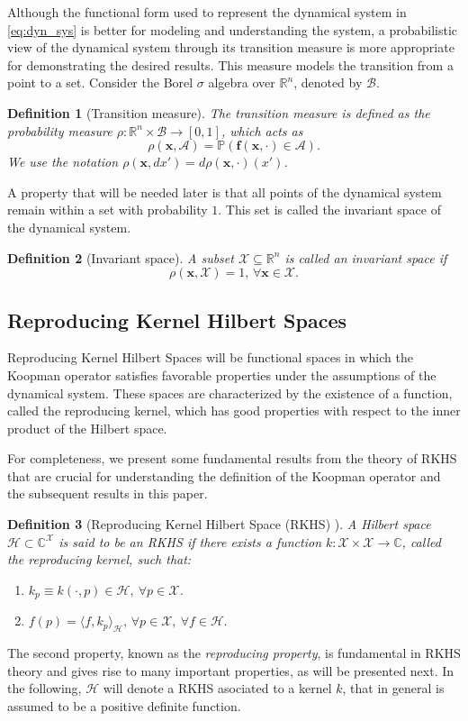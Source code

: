 \documentclass{article}
\newcommand{\R}{\mathbb{R}} %
\renewcommand{\P}{\mathbb{P}} %
\newtheorem{defn}{Definition}
\renewcommand{\H}{\mathcal{H}}
\newcommand{\B}{\mathcal{B}}
\newcommand{\X}{\mathcal{X}}
\begin{document}
Although the functional form used to represent the dynamical system in \eqref{eq:dyn_sys} is better for modeling and understanding the system, a probabilistic view of the dynamical system through its transition measure is more appropriate for demonstrating the desired results. This measure models the transition from a point to a set. Consider the Borel \(\sigma\) algebra over $\R^n$, denoted by $\B$.

\begin{defn}[Transition measure] \label{def:transition_measure} The \textit{transition measure} is defined as the probability measure
\(\rho: \R^n \times \B \to [0, 1]\), which acts as
\[
\rho(\mathbf{x}, \mathcal{A}) = \P (\mathbf{f}(\mathbf{x}, \cdot) \in \mathcal{A}).
\]
We use the notation \(\rho (\mathbf{x}, dx') = d\rho(\mathbf{x}, \cdot) (x')\).
\end{defn}
A property that will be needed later is that all points of the dynamical system remain within a set with probability $1$. This set is called the invariant space of the dynamical system.

\begin{defn}[Invariant space] A subset $\X \subseteq \R^n$ is called an \textit{invariant space} if 
\[
\rho (\mathbf{x}, \X) = 1, \, \forall \mathbf{x} \in \X.
\]
\end{defn}

\subsection{Reproducing Kernel Hilbert Spaces}

Reproducing Kernel Hilbert Spaces will be functional spaces in which the Koopman operator satisfies favorable properties under the assumptions of the dynamical system. These spaces are characterized by the existence of a function, called the reproducing kernel, which has good properties with respect to the inner product of the Hilbert space.

For completeness, we present some fundamental results from the theory of RKHS that are crucial for understanding the definition of the Koopman operator and the subsequent results in this paper.

\begin{defn}[Reproducing Kernel Hilbert Space (RKHS) \cite{Mercer1909XVI.Equations}]
A Hilbert space \( \H \subset \mathbb{C}^{\X} \) is said to be an RKHS if there exists a function \( k: \X \times \X \to \mathbb{C} \), called the \textit{reproducing kernel}, such that:
\begin{enumerate}
    \item \( k_p \equiv k(\cdot, p) \in \H, \ \forall p \in \X \).
    \item \( f(p) = \langle f, k_p \rangle_{\H}, \, \forall p \in \X, \ \forall f \in \H. \)
\end{enumerate}
\end{defn}
The second property, known as the \textit{reproducing property}, is fundamental in RKHS theory and gives rise to many important properties, as will be presented next. In the following, $\H$ will denote a RKHS asociated to a kernel $k$, that in general is assumed to be a positive definite function.
\end{document}
